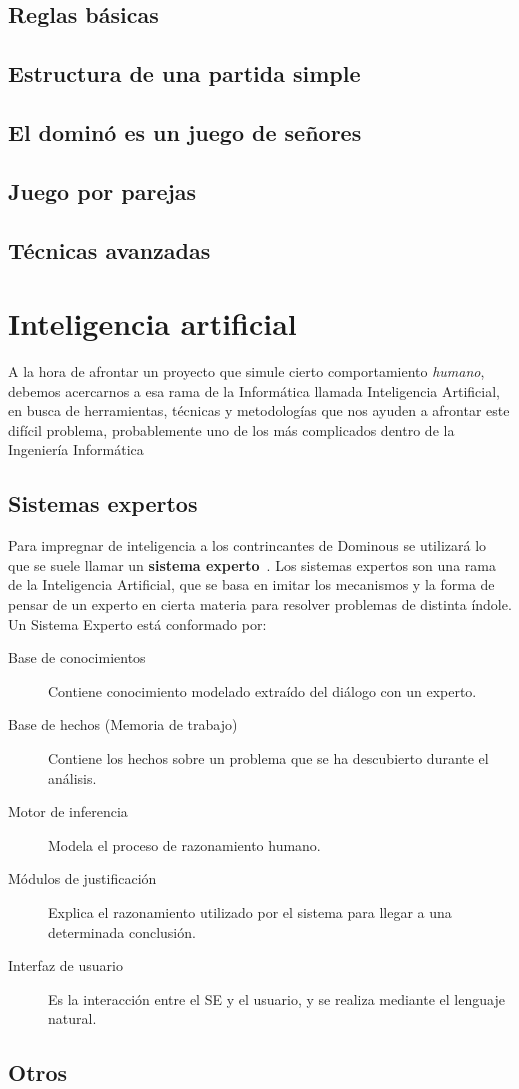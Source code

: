 \subsection{Reglas básicas}
\subsection{Estructura de una partida simple}
\subsection{El dominó es un juego de señores}
\subsection{Juego por parejas}
\subsection{Técnicas avanzadas}

\section{Inteligencia artificial}

A la hora de afrontar un proyecto que simule cierto comportamiento \emph{humano}, debemos acercarnos a esa rama de la
Informática llamada Inteligencia Artificial, en busca de herramientas, técnicas y metodologías que nos ayuden a afrontar este
difícil problema, probablemente uno de los más complicados dentro de la Ingeniería Informática

\subsection{Sistemas expertos}

Para impregnar de inteligencia a los contrincantes de Dominous se utilizará lo que se suele llamar un \textbf{sistema experto}~\cite{Giarratano:1989:ESP:583478}.
Los sistemas expertos son una rama de la Inteligencia Artificial, que se basa en imitar los mecanismos y la forma de
pensar de un experto en cierta materia para resolver problemas de distinta índole.\\

Un Sistema Experto está conformado por:
\begin{description}
    \item[Base de conocimientos] Contiene conocimiento modelado extraído del diálogo con un experto.
    \item[Base de hechos (Memoria de trabajo)] Contiene los hechos sobre un problema que se ha descubierto durante el análisis.
    \item[Motor de inferencia] Modela el proceso de razonamiento humano.
    \item[Módulos de justificación] Explica el razonamiento utilizado por el sistema para llegar a una determinada conclusión.
    \item[Interfaz de usuario] Es la interacción entre el SE y el usuario, y se realiza mediante el lenguaje natural.
\end{description}

\subsection{Otros}
